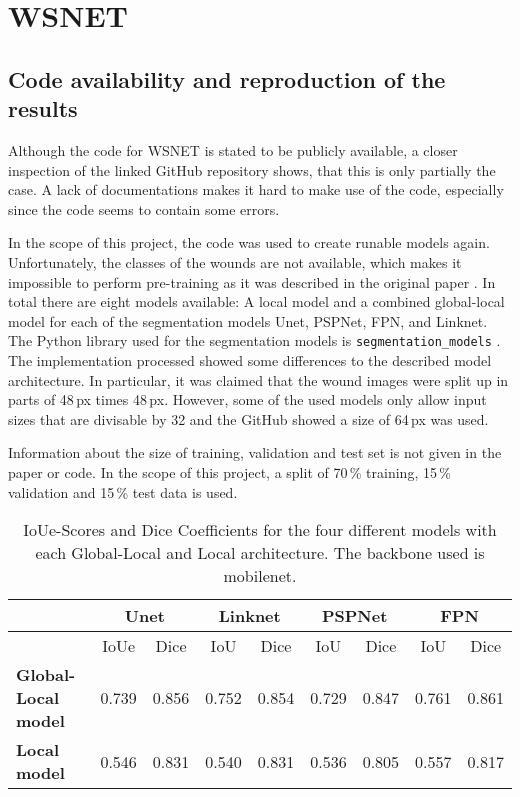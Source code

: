 \section{WSNET}

\subsection{Code availability and reproduction of the results}

Although the code for WSNET \cite{Oota_2023_WACV} is stated to be publicly available, a closer inspection of the linked GitHub repository shows, that this is only partially the case. A lack of documentations makes it hard to make use of the code, especially since the code seems to contain some errors.

In the scope of this project, the code was used to create runable models again. Unfortunately, the classes of the wounds are not available, which makes it impossible to perform pre-training as it was described in the original paper \cite{Oota_2023_WACV}. In total there are eight models available: A local model and a combined global-local model for each of the segmentation models Unet, PSPNet, FPN, and Linknet. The Python library used for the segmentation models is \texttt{segmentation\_models} \cite{SegmentationModels}. The implementation processed showed some differences to the described model architecture. In particular, it was claimed that the wound images were split up in parts of 48\,px times 48\,px. However, some of the used models only allow input sizes that are divisable by 32 and the GitHub showed a size of 64\,px was used.

Information about the size of training, validation and test set is not given in the paper or code. In the scope of this project, a split of 70\,\% training, 15\,\% validation and 15\,\% test data is used. 


\begin{table}[htb!]
	\begin{tabular}{l||c | c | c | c | c | c | c | c|}
	& \multicolumn{2}{|c|}{Unet} & \multicolumn{2}{|c|}{Linknet} & \multicolumn{2}{|c|}{PSPNet} & \multicolumn{2}{|c|}{FPN} \\
	\hline
	& IoUe & Dice & IoU & Dice & IoU & Dice & IoU & Dice \\
	\hline\hline
	\textbf{Global-Local model} & 0.739 & 0.856 & 0.752 & 0.854 & 0.729 & 0.847 & 0.761 & 0.861\\
	\textbf{Local model} & 0.546&  0.831 & 0.540 & 0.831 & 0.536 & 0.805 & 0.557 & 0.817 \\	
	\end{tabular}
	\caption{IoUe-Scores and Dice Coefficients for the four different models with each Global-Local and Local architecture. The backbone used is mobilenet.}
\end{table}
